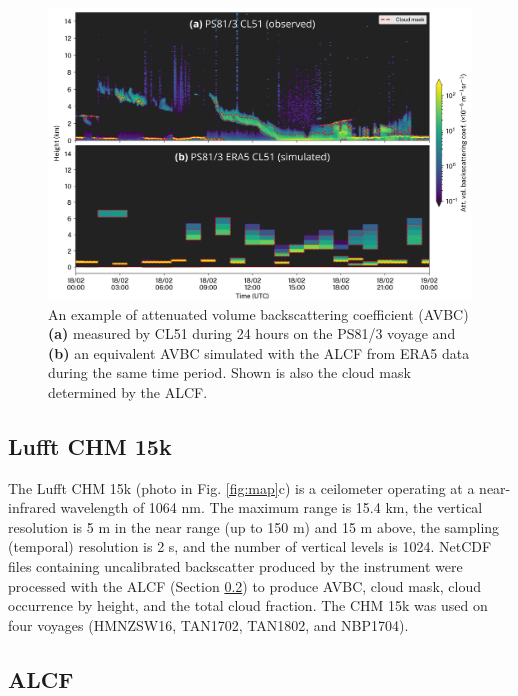 \documentclass[12pt,a4paper]{article}
\begin{document}
\begin{figure}[b!]
\centering
\includegraphics[width=\textwidth]{img/example.png}
\caption{
An example of attenuated volume backscattering coefficient (AVBC) \textbf{(a)}
measured by CL51 during 24 hours on the PS81/3 voyage and \textbf{(b)} an
equivalent AVBC simulated with the ALCF from ERA5 data during the same time
period. Shown is also the cloud mask determined by the ALCF.
}
\label{fig:example}
\end{figure}

\subsection{Lufft CHM 15k}
\label{sec:chm15k}

The Lufft CHM 15k (photo in Fig. \ref{fig:map}c) is a ceilometer operating at a
near-infrared wavelength of 1064 nm. The maximum range is 15.4 km, the vertical
resolution is 5 m in the near range (up to 150 m) and 15 m above, the sampling
(temporal) resolution is 2 s, and the number of vertical levels is 1024.
NetCDF files containing uncalibrated backscatter produced by the instrument
were processed with the ALCF (Section \ref{sec:alcf}) to produce AVBC, cloud
mask, cloud occurrence by height, and the total cloud fraction. The CHM 15k was
used on four voyages (HMNZSW16, TAN1702, TAN1802, and NBP1704).

\subsection{ALCF}
\label{sec:alcf}
\end{document}
